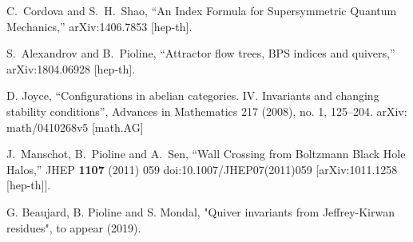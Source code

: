 \documentclass[12pt]{article}
\begin{document}
\begin{thebibliography}{9}
  C.~Cordova and S.~H.~Shao,
  ``An Index Formula for Supersymmetric Quantum Mechanics,''
  arXiv:1406.7853 [hep-th].
     

  S.~Alexandrov and B.~Pioline,
  ``Attractor flow trees, BPS indices and quivers,''
  arXiv:1804.06928 [hep-th].

D. Joyce, ``Configurations in abelian categories. IV. Invariants and changing stability conditions'',
Advances in Mathematics 217 (2008), no. 1, 125–204.
arXiv: math/0410268v5 [math.AG]

  J.~Manschot, B.~Pioline and A.~Sen,
  ``Wall Crossing from Boltzmann Black Hole Halos,''
  JHEP {\bf 1107} (2011) 059
  doi:10.1007/JHEP07(2011)059
  [arXiv:1011.1258 [hep-th]].

G. Beaujard, B. Pioline and S. Mondal, "Quiver invariants from Jeffrey-Kirwan residues", to appear (2019).    


\end{thebibliography}
\end{document}
